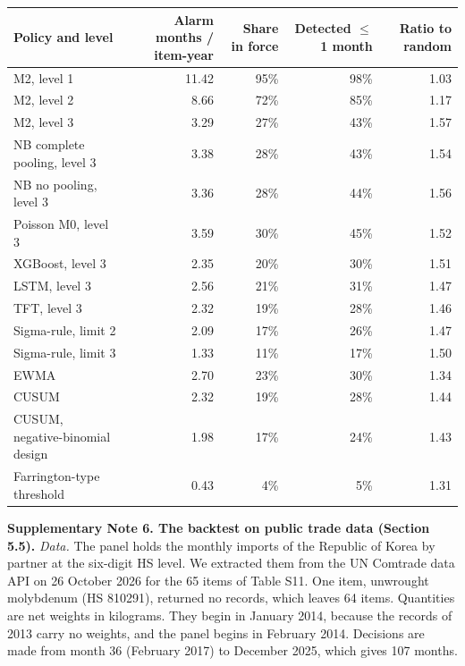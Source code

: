 \documentclass[10pt,a4paper]{article}
\begin{document}
\vspace{6pt}
\noindent\begin{minipage}{\linewidth}
\centering\footnotesize
\begin{tabular}{lrrrr}
\toprule
Policy and level & Alarm months / item-year & Share in force & Detected $\le$ 1 month & Ratio to random \\ \midrule
M2, level 1 & 11.42 & 95\% & 98\% & 1.03 \\
M2, level 2 & 8.66 & 72\% & 85\% & 1.17 \\
M2, level 3 & 3.29 & 27\% & 43\% & 1.57 \\
NB complete pooling, level 3 & 3.38 & 28\% & 43\% & 1.54 \\
NB no pooling, level 3 & 3.36 & 28\% & 44\% & 1.56 \\
Poisson M0, level 3 & 3.59 & 30\% & 45\% & 1.52 \\
XGBoost, level 3 & 2.35 & 20\% & 30\% & 1.51 \\
LSTM, level 3 & 2.56 & 21\% & 31\% & 1.47 \\
TFT, level 3 & 2.32 & 19\% & 28\% & 1.46 \\
Sigma-rule, limit 2 & 2.09 & 17\% & 26\% & 1.47 \\
Sigma-rule, limit 3 & 1.33 & 11\% & 17\% & 1.50 \\
EWMA & 2.70 & 23\% & 30\% & 1.34 \\
CUSUM & 2.32 & 19\% & 28\% & 1.44 \\
CUSUM, negative-binomial design & 1.98 & 17\% & 24\% & 1.43 \\
Farrington-type threshold & 0.43 & 4\% & 5\% & 1.31 \\
\bottomrule
\end{tabular}
\end{minipage}
\vspace{8pt}

\textbf{Supplementary Note 6. The backtest on public trade data (Section 5.5).}
\textit{Data.} The panel holds the monthly imports of the Republic of Korea by partner at the six-digit HS level. We extracted them from the UN Comtrade data API on 26 October 2026 for the 65 items of Table S11. One item, unwrought molybdenum (HS 810291), returned no records, which leaves 64 items. Quantities are net weights in kilograms. They begin in January 2014, because the records of 2013 carry no weights, and the panel begins in February 2014. Decisions are made from month 36 (February 2017) to December 2025, which gives 107 months.
\end{document}
